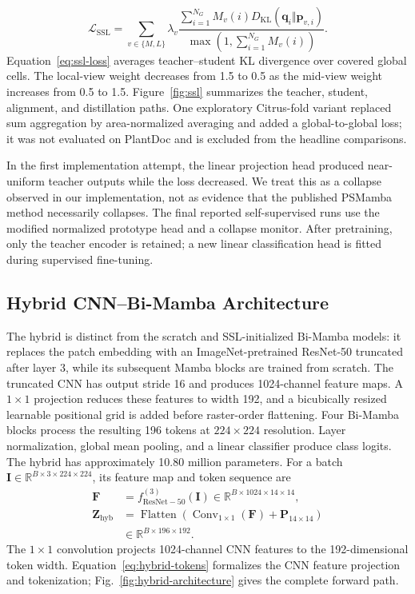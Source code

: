 \documentclass[conference]{IEEEtran}
\begin{document}
\begin{equation}
    \mathcal{L}_{\mathrm{SSL}}=\sum_{v\in\{M,L\}}\lambda_v\frac{\sum_{i=1}^{N_G}M_v(i)D_{\mathrm{KL}}(\mathbf{q}_{i}\Vert\mathbf{p}_{v,i})}{\max\!\left(1,\sum_{i=1}^{N_G}M_v(i)\right)}.
    \label{eq:ssl-loss}
\end{equation}
Equation~\eqref{eq:ssl-loss} averages teacher--student KL divergence over covered global cells. The local-view weight decreases from 1.5 to 0.5 as the mid-view weight increases from 0.5 to 1.5. Figure~\ref{fig:ssl} summarizes the teacher, student, alignment, and distillation paths. One exploratory Citrus-fold variant replaced sum aggregation by area-normalized averaging and added a global-to-global loss; it was not evaluated on PlantDoc and is excluded from the headline comparisons.

In the first implementation attempt, the linear projection head produced near-uniform teacher outputs while the loss decreased. We treat this as a collapse observed in our implementation, not as evidence that the published PSMamba method necessarily collapses. The final reported self-supervised runs use the modified normalized prototype head and a collapse monitor. After pretraining, only the teacher encoder is retained; a new linear classification head is fitted during supervised fine-tuning.

\subsection{Hybrid CNN--Bi-Mamba Architecture}
The hybrid is distinct from the scratch and SSL-initialized Bi-Mamba models: it replaces the patch embedding with an ImageNet-pretrained ResNet-50 truncated after layer 3, while its subsequent Mamba blocks are trained from scratch. The truncated CNN has output stride 16 and produces 1024-channel feature maps. A $1\times1$ projection reduces these features to width 192, and a bicubically resized learnable positional grid is added before raster-order flattening. Four Bi-Mamba blocks process the resulting 196 tokens at $224\times224$ resolution. Layer normalization, global mean pooling, and a linear classifier produce class logits. The hybrid has approximately 10.80 million parameters. For a batch $\mathbf{I}\in\mathbb{R}^{B\times3\times224\times224}$, its feature map and token sequence are
\begin{equation}
    \begin{aligned}
    \mathbf{F} &= f_{\mathrm{ResNet-50}}^{(3)}(\mathbf{I})\in\mathbb{R}^{B\times1024\times14\times14},\\
    \mathbf{Z}_{\mathrm{hyb}} &= \operatorname{Flatten}\!\left(\operatorname{Conv}_{1\times1}(\mathbf{F})+\mathbf{P}_{14\times14}\right)\\
    &\in\mathbb{R}^{B\times196\times192}.
    \end{aligned}
    \label{eq:hybrid-tokens}
\end{equation}
The $1\times1$ convolution projects 1024-channel CNN features to the 192-dimensional token width. Equation~\eqref{eq:hybrid-tokens} formalizes the CNN feature projection and tokenization; Fig.~\ref{fig:hybrid-architecture} gives the complete forward path.
\end{document}
